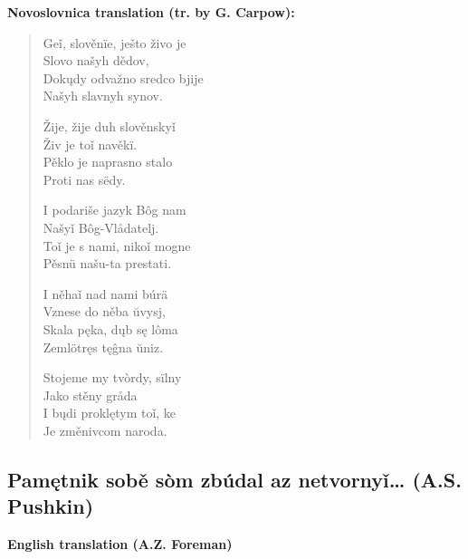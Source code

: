 \textbf{Novoslovnica translation (tr. by G. Carpow):}

\begin{verse}
	Geǐ, slověnïe, ješto živo je \\
	Slovo našyh dědov, \\
	Dokųdy odvažno sredco bjije \\
	Našyh slavnyh synov.
	
	Žije, žije duh slověnskyǐ \\
	Živ je toǐ navěkï. \\
	Pěklo je naprasno stalo \\
	Proti nas sëdy.
	
	I podariše jazyk Bôg nam \\
	Našyǐ Bôg-Vlådatelj. \\
	Toǐ je s nami, nikoǐ mogne \\
	Pěsnü našu-ta prestati.
	
	I něhaǐ nad nami búrä \\
	Vznese do něba ŭvysj, \\
	Skala pęka, dųb sę lôma \\
	Zemlötręs tęĝna ŭniz.
	
	Stojeme my tvòrdy, sïlny \\
	Jako stěny gråda \\
	I bųdi proklętym toǐ, ke \\
	Je změnivcom naroda.
\end{verse}

\subsection{Pamętnik sobě sòm zbúdal az netvornyǐ… (A.S. Pushkin)}

\textbf{English translation (A.Z. Foreman)}

